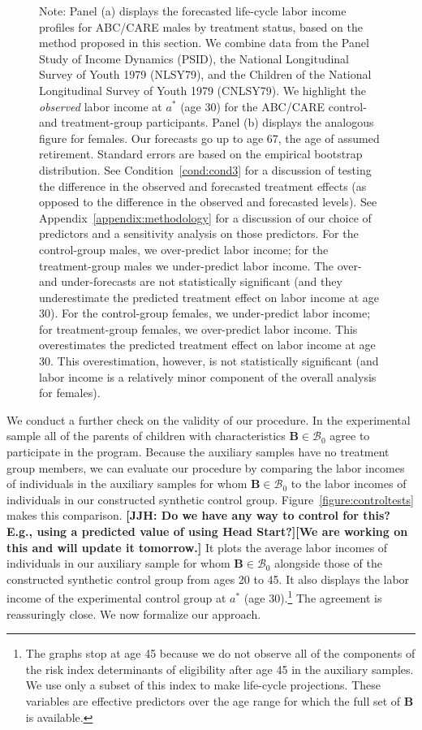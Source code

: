 \begin{figure}
\begin{subfigure}[h]{0.5\textwidth}
\end{subfigure}
\footnotesize \justify
Note: Panel (a) displays the forecasted life-cycle labor income profiles for ABC/CARE males by treatment status, based on the method proposed in this section. We combine data from the Panel Study of Income Dynamics (PSID), the National Longitudinal Survey of Youth 1979 (NLSY79), and the Children of the National Longitudinal Survey of Youth 1979 (CNLSY79). We highlight the \textit{observed} labor income at $a^*$ (age 30) for the ABC/CARE control- and treatment-group participants. Panel (b) displays the analogous figure for females. Our forecasts go up to age 67, the age of assumed retirement. Standard errors are based on the empirical bootstrap distribution. See Condition~\ref{cond:cond3} for a discussion of testing the difference in the observed and forecasted treatment effects (as opposed to the difference in the observed and forecasted levels). See  Appendix~\ref{appendix:methodology} for a discussion of our choice of predictors and a sensitivity analysis on those predictors. For the control-group males, we over-predict labor income; for the treatment-group males we under-predict labor income. The over- and under-forecasts are not statistically significant (and they underestimate the predicted treatment effect on labor income at age 30). For the control-group females, we under-predict labor income; for treatment-group females, we over-predict labor income. This overestimates the predicted treatment effect on labor income at age 30. This overestimation, however, is not statistically significant (and labor income is a relatively minor component of the overall analysis for females).
\end{figure}

We conduct a further check on the validity of our procedure. In the experimental sample all of the parents of children with characteristics $\bm{B} \in \mathcal{B}_0$ agree to participate in the program.  Because the auxiliary samples have no treatment group members, we can evaluate our procedure by comparing the labor incomes of individuals in the auxiliary samples for whom $\bm{B} \in \mathcal{B}_0$ to the labor incomes of individuals in our constructed synthetic control group. Figure~\ref{figure:controltests} makes this comparison. \textbf{[JJH: Do we have any way to control for this? E.g., using a predicted value of using Head Start?][We are working on this and will update it tomorrow.]} It plots the average labor incomes of individuals in our auxiliary sample for whom $\bm{B} \in \mathcal{B}_0$ alongside those of the constructed synthetic control group from ages 20 to 45. It also displays the labor income of the experimental control group at $a^*$ (age 30).\footnote{The graphs stop at age 45 because we do not observe all of the components of the risk index determinants of eligibility after age 45 in the auxiliary samples. We use only a subset of this index to make life-cycle projections. These variables are effective predictors over the age range for which the full set of $\bm{B}$ is available.} The agreement is reassuringly close. We now formalize our approach.

